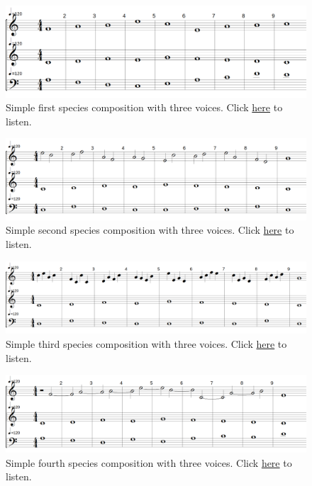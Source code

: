 \begin{figure}[h!]
    \centering
    \includegraphics[width=1\textwidth]{Images/Musicality/simple-test-1sp.png}
    \caption{Simple first species composition with three voices. Click \href{https://youtu.be/qIresNFcmWY}{here} to listen.}
    \label{fig:simple-test-1sp}
\end{figure}
\begin{figure}[h!]
    \centering
    \includegraphics[width=1\textwidth]{Images/Musicality/simple-test-2sp.png}
    \caption{Simple second species composition with three voices. Click \href{https://youtu.be/fiAc3CNdWHo}{here} to listen.}
    \label{fig:simple-test-2sp}
\end{figure}
\begin{figure}[h!]
    \centering
    \includegraphics[width=1\textwidth]{Images/Musicality/simple-test-3sp.png}
    \caption{Simple third species composition with three voices. Click \href{https://youtu.be/r6MaQHyTLs8}{here} to listen.}
    \label{fig:simple-test-3sp}
\end{figure}
\begin{figure}[h!]
    \centering
    \includegraphics[width=1\textwidth]{Images/Musicality/simple-test-4sp.png}
    \caption{Simple fourth species composition with three voices. Click \href{https://youtu.be/gcGoXKLcV_I}{here} to listen.}
    \label{fig:simple-test-4sp}
\end{figure}

